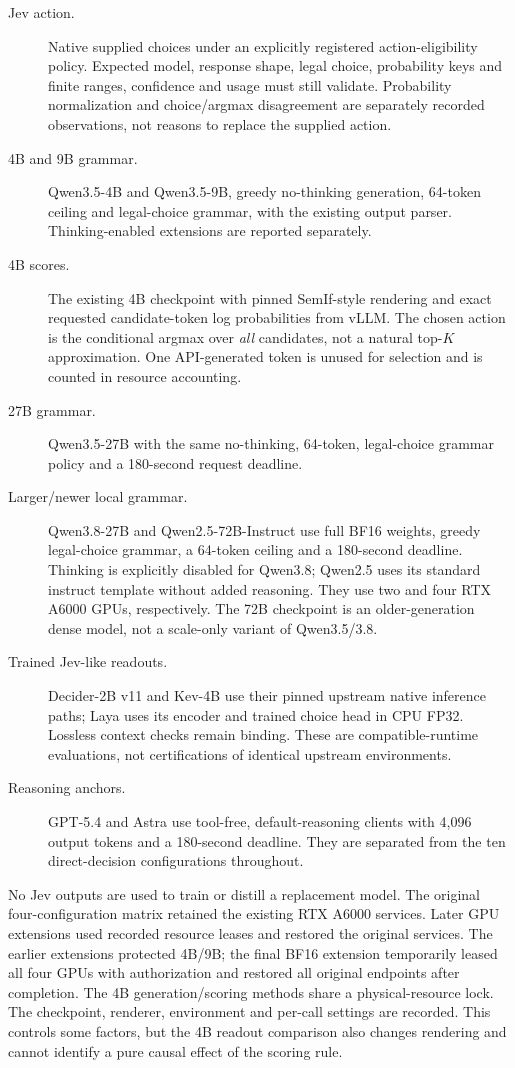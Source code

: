\begin{description}
 \item[Jev action.] Native supplied choices under an explicitly registered
 action-eligibility policy. Expected model, response shape, legal choice,
 probability keys and finite ranges, confidence and usage must still validate.
 Probability normalization and choice/argmax disagreement are separately
 recorded observations, not reasons to replace the supplied action.
 \item[4B and 9B grammar.] Qwen3.5-4B and Qwen3.5-9B, greedy no-thinking
 generation, 64-token ceiling and legal-choice grammar, with the existing
 output parser. Thinking-enabled extensions are reported separately.
 \item[4B scores.] The existing 4B checkpoint with pinned SemIf-style
 rendering and exact requested candidate-token log probabilities from vLLM.
 The chosen action is the conditional argmax over \emph{all} candidates, not
 a natural top-$K$ approximation. One API-generated token is unused for
 selection and is counted in resource accounting.
 \item[27B grammar.] Qwen3.5-27B with the same no-thinking, 64-token,
 legal-choice grammar policy and a 180-second request deadline.
 \item[Larger/newer local grammar.] Qwen3.8-27B and Qwen2.5-72B-Instruct
 use full BF16 weights, greedy legal-choice grammar, a 64-token ceiling
 and a 180-second deadline. Thinking is explicitly disabled for Qwen3.8;
 Qwen2.5 uses its standard instruct template without added reasoning.
 They use two and four RTX A6000 GPUs, respectively. The 72B checkpoint
 is an older-generation dense model, not a scale-only variant of Qwen3.5/3.8.
 \item[Trained Jev-like readouts.] Decider-2B v11 and Kev-4B use their
 pinned upstream native inference paths; Laya uses its encoder and trained
 choice head in CPU FP32. Lossless context checks remain binding.
 These are compatible-runtime evaluations, not certifications of identical
 upstream environments.
 \item[Reasoning anchors.] GPT-5.4 and Astra use tool-free, default-reasoning
 clients with 4,096 output tokens and a 180-second deadline. They are
 separated from the ten direct-decision configurations throughout.
\end{description}
No Jev outputs are used to train or distill a replacement model.
The original four-configuration matrix retained the existing RTX A6000
services. Later GPU extensions used recorded resource leases and restored
the original services. The earlier extensions protected 4B/9B;
the final BF16 extension temporarily leased all four GPUs with authorization
and restored all original endpoints after completion.
The 4B generation/scoring methods share a physical-resource lock.
The checkpoint, renderer, environment and per-call settings are recorded.
This controls some factors, but the 4B readout comparison also changes rendering
and cannot identify a pure causal effect of the scoring rule.

